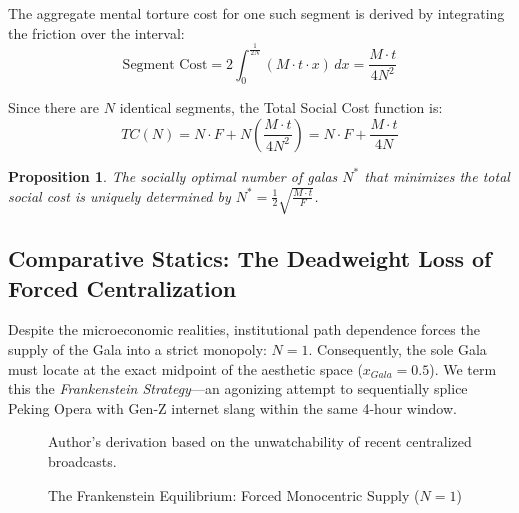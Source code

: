 \documentclass[AER]{AEA}
\newtheorem{proposition}[theorem]{Proposition}
\begin{document}
The aggregate mental torture cost for one such segment is derived by integrating the friction over the interval:
\begin{equation}
    \text{Segment Cost} = 2 \int_{0}^{\frac{1}{2N}} (M \cdot t \cdot x) \, dx = \frac{M \cdot t}{4N^2}
\end{equation}

Since there are $N$ identical segments, the Total Social Cost function is:
\begin{equation}
    TC(N) = N \cdot F + N \left( \frac{M \cdot t}{4N^2} \right) = N \cdot F + \frac{M \cdot t}{4N}
\end{equation}

\begin{proposition}
The socially optimal number of galas $N^*$ that minimizes the total social cost is uniquely determined by $N^* = \frac{1}{2} \sqrt{\frac{M \cdot t}{F}}$.
\end{proposition}

\subsection{Comparative Statics: The Deadweight Loss of Forced Centralization}

Despite the microeconomic realities, institutional path dependence forces the supply of the Gala into a strict monopoly: $N = 1$. Consequently, the sole Gala must locate at the exact midpoint of the aesthetic space ($x_{Gala} = 0.5$). We term this the \textit{Frankenstein Strategy}—an agonizing attempt to sequentially splice Peking Opera with Gen-Z internet slang within the same 4-hour window.

\begin{figure}[ht]
\centering
{}
\caption{The Frankenstein Equilibrium: Forced Monocentric Supply ($N=1$)}
\begin{figurenotes}[Source]
Author's derivation based on the unwatchability of recent centralized broadcasts.
\end{figurenotes}
\end{figure}
\end{document}
